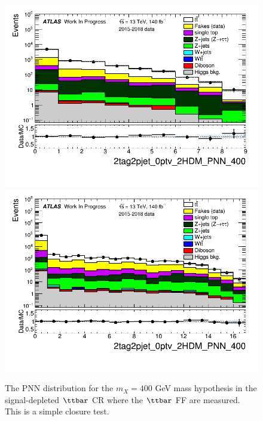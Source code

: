 \begin{figure}
\centering
\includegraphics[width=.45\textwidth]{figures/lephadFF/LTT/2tag2pjet_0ptv_2HDM_PNN_400_SR_ALLFAKES_LTT_ttCR_noNeg_log.png}
\includegraphics[width=.45\textwidth]{figures/lephadFF/SLT/2tag2pjet_0ptv_2HDM_PNN_400_SR_ALLFAKES_SLT_ttCR_noNeg_log.png}\\
\caption{The PNN distribution for the $m_{X} = 400$ GeV mass hypothesis in the signal-depleted $\ttbar$ CR where the $\ttbar$ FF are measured. This is a simple closure test.} 
\label{fig:ttCR_val}
\end{figure}



